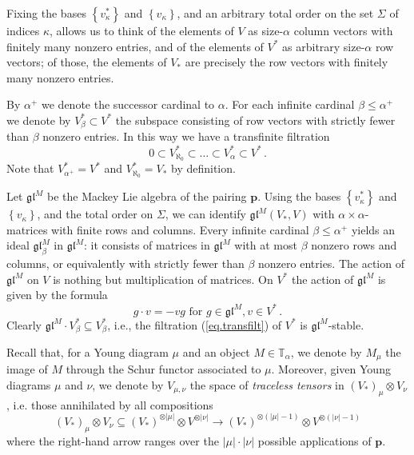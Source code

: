 \documentclass[11pt]{article}
\theoremstyle{plain}
\theoremstyle{nonumberplain}
\theoremstyle{plain}
\theoremstyle{nonumberplain}
\newcommand\bT{\mathbb T}
\newcommand\fgl{\mathfrak{gl}}
\begin{document}
Fixing the bases $\left\{v^*_\kappa\right\}$ and $\left\{v_\kappa\right\}$, and an arbitrary total order on the set $\Sigma$ of indices $\kappa$, allows us to think of the elements of $V$ as size-$\alpha$ column vectors with
finitely many nonzero entries, and of the {elements} of $V^*$
as arbitrary size-$\alpha$ row vectors; of those, the elements of
$V_*$ are precisely the row vectors with finitely many nonzero
entries.  

{By $\alpha^+$ we denote the successor cardinal
  to $\alpha$.}  For each infinite cardinal $\beta\le \alpha^+$ we denote by
$V^*_\beta\subset V^*$ the subspace consisting of row vectors with
strictly fewer than $\beta$ nonzero entries.   In this way we have a transfinite filtration
\begin{equation}
0\subset V^*_{\aleph_0}\subset \ldots \subset V^*_\alpha \subset V^*\,.
\label{eq.transfilt}\end{equation}
Note that $V^*_{\alpha^+}=V^*$ and $V^*_{\aleph_0}=V_*$ by definition. 

Let $\fgl^M$ be the Mackey Lie algebra of the pairing $\mathbf{p}$.
Using the bases $\left\{v^*_\kappa\right\}$ and
$\left\{v_\kappa\right\}$, and the total order on $\Sigma$, we can
identify $\fgl^M(V_*,V)$ with $\alpha\times\alpha$-matrices with
finite rows and columns.  Every infinite cardinal $\beta\leq\alpha^+$
yields an ideal $\fgl^M_\beta$ in $\fgl^M$: it consists of matrices in
$\fgl^M$ with at most $\beta$ nonzero rows and columns, or
equivalently with strictly fewer than $\beta$ nonzero entries.  The
action of $\fgl^M$ on $V$ is nothing but multiplication of matrices.
On $V^*$ the action of $\fgl^M$ is given by the formula
$$g\cdot v=-vg\text{ for }g\in\fgl^M, v\in V^*\,.$$
Clearly $\fgl^M\cdot V_\beta^*\subseteq V_\beta^*$, i.e., the filtration (\ref{eq.transfilt}) of $V^*$ is $\fgl^M$-stable.  %


Recall that, for a Young diagram $\mu$ and an object
$M \in \bT_{\alpha}$, we denote by $M_\mu$ the image of $M$ through
the Schur functor associated to $\mu$. Moreover, given Young diagrams
$\mu$ and $\nu$, we denote by $V_{\mu,\nu}$ the space of {\it traceless
  tensors} in $(V_*)_\mu\otimes V_\nu$, i.e. those annihilated by all
compositions
\begin{equation*}
  (V_*)_\mu\otimes V_\nu \subseteq (V_*)^{\otimes |\mu|}\otimes V^{\otimes |\nu|} \to (V_*)^{\otimes (|\mu|-1)}\otimes V^{\otimes (|\nu|-1)}
\end{equation*}
where the right-hand arrow ranges over the $|\mu|\cdot|\nu|$
possible applications of $\mathbf{p}$.
\end{document}
